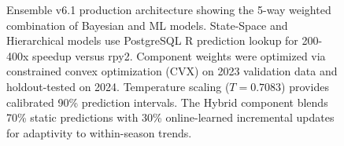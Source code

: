 \begin{figure}[htbp]
\begin{tikzpicture}
\end{tikzpicture}
\caption[Ensemble v6.1 Architecture]{Ensemble v6.1 production architecture showing the 5-way weighted combination of Bayesian and ML models. State-Space and Hierarchical models use PostgreSQL R prediction lookup for 200-400x speedup versus rpy2. Component weights were optimized via constrained convex optimization (CVX) on 2023 validation data and holdout-tested on 2024. Temperature scaling ($T=0.7083$) provides calibrated 90\% prediction intervals. The Hybrid component blends 70\% static predictions with 30\% online-learned incremental updates for adaptivity to within-season trends.}
\label{fig:ensemble-v6-architecture}
\end{figure}
